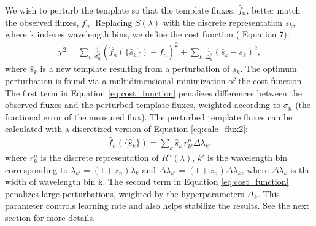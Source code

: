\documentclass[twocolumn]{aastex63}
\begin{document}
    We wish to perturb the template so that the template fluxes, $\hat{f}_n$, better match the observed fluxes, $f_n$. 
    Replacing $S(\lambda)$ with the discrete representation $s_k$, where k indexes wavelength bins, we define the cost function (\citealt{Budavari2000b} Equation 7):
    \begin{align}
        \chi^2 =
        \sum_n \frac{1}{\sigma_n^2}(\hat{f}_n(\{\hat{s}_k\}) - f_n)^2 + 
        \sum_k \frac{1}{\Delta_k^2}(\hat{s}_k - s_k)^2, \label{eq:cost_function}
    \end{align}
    where $\hat{s}_k$ is a new template resulting from a perturbation of $s_k$.
    The optimum perturbation is found via a multidimensional minimization of the cost function. 
    The first term in Equation \ref{eq:cost_function} penalizes differences between the observed fluxes and the perturbed template fluxes, weighted according to $\sigma_n$ (the fractional error of the measured flux). 
    The perturbed template fluxes can be calculated with a discretized version of Equation \ref{eq:calc_flux2}:
    \begin{align}
        \hat{f}_n(\{\hat{s}_k\}) = \sum_k \hat{s}_k \, r_{k'}^n \Delta\lambda_{k'}
    \end{align}
    where $r_k^n$ is the discrete representation of $R^n(\lambda)$, $k'$ is the wavelength bin corresponding to $\lambda_{k'} = (1+z_n) \lambda_k$ and $\Delta\lambda_{k'} = (1+z_n)\Delta\lambda_k$, where $\Delta\lambda_k$ is the width of wavelength bin k. 
    The second term in Equation \ref{eq:cost_function} penalizes large perturbations, weighted by the hyperparameters $\Delta_k$. 
    This parameter controls learning rate and also helps stabilize the results. 
    See the next section for more details. 
\end{document}
